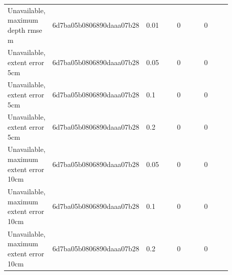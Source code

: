 \begin{longtable}{p{0.1760\linewidth}p{0.1760\linewidth}p{0.1760\linewidth}p{0.1760\linewidth}p{0.1760\linewidth}}
Unavailable, maximum depth rmse m & 6d7ba05b0806890daaa07b28 & 0.01 & 0 & 0 \\
Unavailable, extent error 5cm & 6d7ba05b0806890daaa07b28 & 0.05 & 0 & 0 \\
Unavailable, extent error 5cm & 6d7ba05b0806890daaa07b28 & 0.1 & 0 & 0 \\
Unavailable, extent error 5cm & 6d7ba05b0806890daaa07b28 & 0.2 & 0 & 0 \\
Unavailable, maximum extent error 10cm & 6d7ba05b0806890daaa07b28 & 0.05 & 0 & 0 \\
Unavailable, maximum extent error 10cm & 6d7ba05b0806890daaa07b28 & 0.1 & 0 & 0 \\
Unavailable, maximum extent error 10cm & 6d7ba05b0806890daaa07b28 & 0.2 & 0 & 0 \\
\end{longtable}
